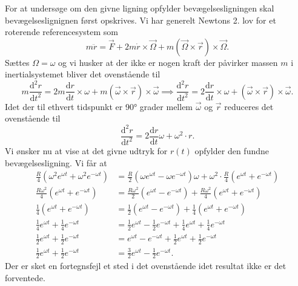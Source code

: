 \documentclass[12pt]{article}
\theoremstyle{definition}
\begin{document}
For at undersøge om den givne ligning opfylder bevægelsesligningen skal bevægelseslignignen først opskrives. Vi har generelt Newtons 2. lov for et roterende referencesystem som
\[ 
m \ddot{r} = \Vec{F} + 2m \dot{r} \times \Vec{\Omega} + m \left( \Vec{\Omega}\times \Vec{r} \right)\times \Vec{\Omega}
.\]
Sættes $\Omega = \omega$ og vi husker at der ikke er nogen kraft der påvirker massen $m$ i inertialsystemet bliver det ovenstående til
\[ 
m \frac{\mathrm{d}^2 r}{\mathrm{d}t^2} = 2m \frac{\mathrm{d}r}{\mathrm{d}t} \times\omega + m \left( \Vec{\omega} \times \Vec{r} \right) \times \Vec{\omega} \implies \frac{\mathrm{d}^2 r}{\mathrm{d}t^2} = 2 \frac{\mathrm{d}r}{\mathrm{d}t}\times\omega + \left( \Vec{\omega} \times \Vec{r} \right) \times \Vec{\omega}
.\]
Idet der til ethvert tidspunkt er \ang{90} grader mellem $\Vec{\omega}$ og $\Vec{r}$ reduceres det ovenstående til
\[ 
\frac{\mathrm{d}^2r}{\mathrm{d}t^2} = 2 \frac{\mathrm{d}r}{\mathrm{d}t}\omega + \omega^2 \cdot r
.\]
Vi ønsker nu at vise at det givne udtryk for $r(t)$ opfylder den fundne bevægelsesligning. Vi får at
\begin{align*}
  \frac{R}{4} \left( \omega^2 e^{\omega t} + \omega^2 e^{-\omega t} \right) &= \frac{R}{2}\left( \omega e^{\omega t} - \omega e^{-\omega t} \right)\omega + \omega^2 \cdot \frac{R}{4}(e^{\omega t} + e^{-\omega t}) \\
  \frac{R\omega^2}{4}\left( e^{\omega t} + e^{-\omega t} \right) &= \frac{R\omega^2}{2} \left( e^{\omega t} - e^{-\omega t} \right) + \frac{R\omega^2}{4} \left( e^{\omega t} + e^{-\omega t} \right)\\
  \frac{1}{4} \left( e^{\omega t} + e^{-\omega t} \right) &= \frac{1}{2} \left( e^{\omega t} - e^{-\omega t} \right) + \frac{1}{4} \left( e^{\omega t} + e^{-\omega t} \right) \\
  \frac{1}{4}e^{\omega t} + \frac{1}{4}e^{-\omega t} &= \frac{1}{2} e^{\omega t} - \frac{1}{2} e^{-\omega t} + \frac{1}{4} e^{\omega t} + \frac{1}{4} e^{-\omega t} \\
  \frac{1}{2}e^{\omega t} + \frac{1}{2}e^{-\omega t} &= e^{\omega t} - e^{-\omega t} + \frac{1}{2}e^{\omega t} + \frac{1}{2}e^{-\omega t}  \\
  \frac{1}{2}e^{\omega t} + \frac{1}{2}e^{-\omega t} &= \frac{3}{2} e^{\omega t} - \frac{1}{2}e^{-\omega t}
.\end{align*}
Der er sket en fortegnsfejl et sted i det ovenstående idet resultat ikke er det forventede.
\end{document}
